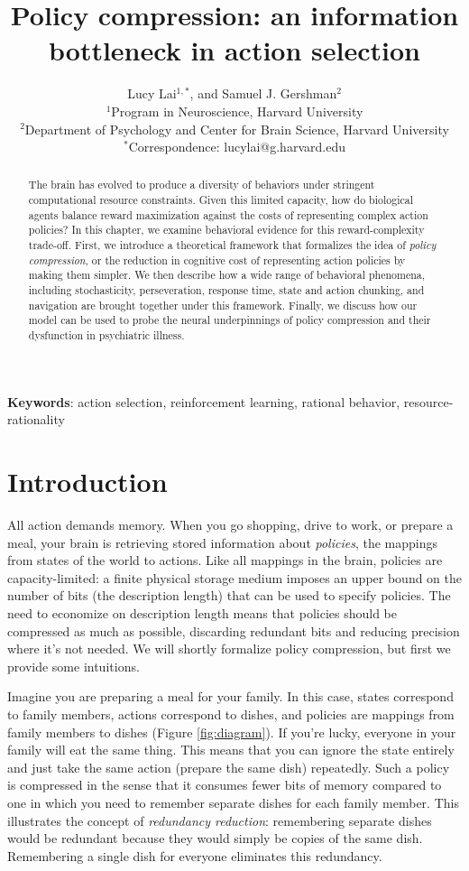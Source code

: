 \documentclass[11pt]{article}
\title{\textbf{Policy compression: an information bottleneck in action selection}}
\author{Lucy Lai$^{1,\ast}$, and Samuel J. Gershman$^{2}$ \\
$^1$Program in Neuroscience, Harvard University \\
$^2$Department of Psychology and Center for Brain Science, Harvard University \\
$^\ast$Correspondence: lucylai@g.harvard.edu}
\date{}
\providecommand{\keywords}[1]
{\small	
  \textbf{Keywords}: #1}
\begin{document}
\maketitle
\tableofcontents

\begin{abstract}
   The brain has evolved to produce a diversity of behaviors under stringent computational resource constraints. Given this limited capacity, how do biological agents balance reward maximization against the costs of representing complex action policies? In this chapter, we examine behavioral evidence for this reward-complexity trade-off. First, we introduce a theoretical framework that formalizes the idea of \emph{policy compression}, or the reduction in cognitive cost of representing action policies by making them simpler. We then describe how a wide range of behavioral phenomena, including stochasticity, perseveration, response time, state and action chunking, and navigation are brought together under this framework. Finally, we discuss how our model can be used to probe the neural underpinnings of policy compression and their dysfunction in psychiatric illness.
\end{abstract}

\keywords{action selection, reinforcement learning, rational behavior,  resource-rationality}

\section{Introduction}

All action demands memory. When you go shopping, drive to work, or prepare a meal, your brain is retrieving stored information about \emph{policies}, the mappings from states of the world to actions. Like all mappings in the brain, policies are capacity-limited: a finite physical storage medium imposes an upper bound on the number of bits (the description length) that can be used to specify policies. The need to economize on description length means that policies should be compressed as much as possible, discarding redundant bits and reducing precision where it's not needed. We will shortly formalize policy compression, but first we provide some intuitions.

Imagine you are preparing a meal for your family. In this case, states correspond to family members, actions correspond to dishes, and policies are mappings from family members to dishes (Figure \ref{fig:diagram}). If you're lucky, everyone in your family will eat the same thing. This means that you can ignore the state entirely and just take the same action (prepare the same dish) repeatedly. Such a policy is compressed in the sense that it consumes fewer bits of memory compared to one in which you need to remember separate dishes for each family member. This illustrates the concept of \emph{redundancy reduction}: remembering separate dishes would be redundant because they would simply be copies of the same dish. Remembering a single dish for everyone eliminates this redundancy.
\end{document}
